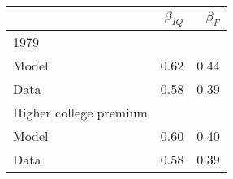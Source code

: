 \begin{tabular}{lrr}
\hline
  & $\beta_{IQ}$  & $\beta_{F}$  \\ 
\hline
1979 &   &   \\ 
Model & 0.62  & 0.44  \\ 
Data & 0.58  & 0.39  \\ 
Higher college premium &   &   \\ 
Model & 0.60  & 0.40  \\ 
Data & 0.58  & 0.39  \\ 
\hline
\end{tabular}%
